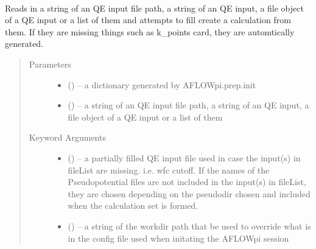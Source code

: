 \documentclass[letterpaper,10pt,english]{sphinxmanual}
\begin{document}
\begin{fulllineitems}
\label{\detokenize{prep:prep.init}}~

\begin{fulllineitems}
\label{\detokenize{prep:prep.init.from_file}}
Reads in a string of an QE input file path, a string of an QE input, a file object of a
QE input or a list of them and attempts to fill create a calculation from them. If they
are missing things such as k\_points card, they are automtically generated.
\begin{quote}\begin{description}
\item[{Parameters}] \leavevmode\begin{itemize}
\item {} 
 () -- a dictionary generated by AFLOWpi.prep.init

\item {} 
 () -- a string of an QE input file path, a string of an QE input, a file
object of a QE input or a list of them

\end{itemize}

\item[{Keyword Arguments}] \leavevmode\begin{itemize}
\item {} 
 () -- a partially filled QE input file used in case the input(s) in fileList
are missing. i.e. wfc cutoff. If the names of the Pseudopotential files
are not included in the input(s) in fileList, they are chosen depending
on the pseudodir chosen and included when the calculation set is formed.

\item {} 
 () -- a string of the workdir path that be used to override what is in the
config file used when initating the AFLOWpi session


\end{itemize}
\end{description}
\end{quote}
\end{fulllineitems}
\end{fulllineitems}
\end{document}
